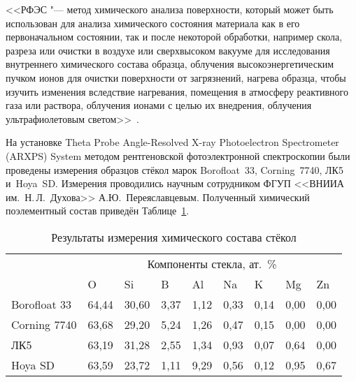 <<РФЭС "--- метод химического анализа поверхности, который может быть использован для анализа химического состояния материала как в его первоначальном состоянии, так и после некоторой обработки, например скола, разреза или очистки в воздухе или сверхвысоком вакууме для исследования внутреннего химического состава образца, облучения высокоэнергетическим пучком ионов для очистки поверхности от загрязнений, нагрева образца, чтобы изучить изменения вследствие нагревания, помещения в атмосферу реактивного газа или раствора, облучения ионами с целью их внедрения, облучения ультрафиолетовым светом>>~\cite{wiki_arxps}.

На установке Theta Probe {Angle-Resolved} {X-ray} Photoelectron Spectrometer (ARXPS) System методом рентгеновской фотоэлектронной спектроскопии были проведены измерения образцов стёкол марок Borofloat~33, Corning~7740, ЛК5 и~Hoya~SD.
Измерения проводились
научным сотрудником ФГУП <<ВНИИА им.~Н.\,Л.~Духова>>
А.\:Ю.~Переяславцевым.
Полученный химический поэлементный состав приведён Таблице~\ref{tab:results_arxps_glass}.

\begin{table} [!ht]
    \centering%
    \parbox{0.8\textwidth}{
    	\caption{Результаты измерения химического состава стёкол}%
    	\label{tab:results_arxps_glass}%
	}
    \renewcommand{\arraystretch}{1.3}%
    \begin{SingleSpace}
    \begin{tabularx}{0.8\textwidth}{@{}
    >{\raggedright}X
    llllllll@{}}
    \toprule
        \multirow{2}{*}{Марка стекла}
        &
        \multicolumn{8}{c}{Компоненты стекла, ат.~\%} \\
    \cmidrule(l){2-9}
        & O & Si & B & Al & Na & K & Mg & Zn \\
    \midrule
        Borofloat 33 & 64,44 &  30,60 &  3,37 &   1,12 &   0,33 &  0,14 &   0,00 &   0,00 \\
        Corning 7740 & 63,68 &  29,20 &  5,24 &   1,26 &   0,47 &  0,15 &   0,00 &   0,00 \\
        ЛК5          & 63,19 &  31,28 &  2,55 &   1,34 &   0,93 &  0,07 &   0,64 &   0,00 \\
        Hoya SD\nb-2 & 63,59 &  23,72 &  1,11 &   9,29 &   0,56 &  0,12 &   0,95 &   0,67 \\
    \bottomrule %
	\end{tabularx}%
    \end{SingleSpace}
\end{table}

